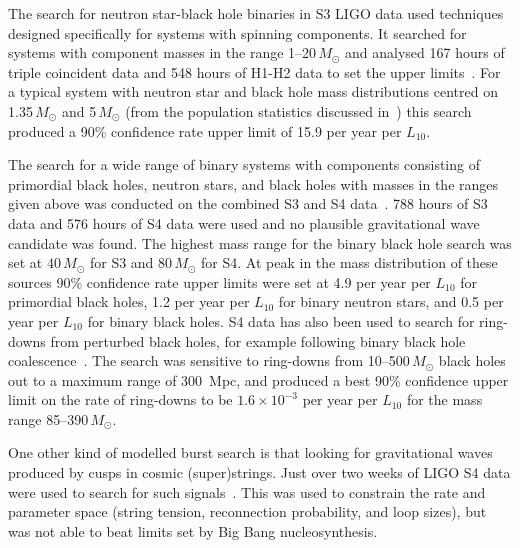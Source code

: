 \documentclass{article}
\begin{document}
The search for neutron star-black hole binaries in S3 LIGO data used techniques
designed specifically for systems with spinning components. It searched for
systems with component masses in the range 1--20\,$M_{\odot}$ and analysed 167
hours of triple coincident data and 548 hours of H1-H2 data to set the upper
limits~\cite{Abbott:2008d}. For a typical system with neutron star and black
hole mass distributions centred on 1.35\,$M_{\odot}$ and 5\,$M_{\odot}$ (from
the population statistics discussed in~\cite{Abbott:2008a}) this search produced
a 90\% confidence rate upper limit of 15.9 per year per $L_{10}$.

The search for a wide range of binary systems with components consisting of
primordial black holes, neutron stars, and black holes with masses in the ranges
given above was conducted on the combined S3 and S4 data~\cite{Abbott:2008a}.
788 hours of S3 data and 576 hours of S4 data were used and no plausible
gravitational wave candidate was found. The highest mass range for the binary
black hole search was set at $40\,M_{\odot}$ for S3 and $80\,M_{\odot}$ for S4. At peak in the
mass distribution of these sources 90\% confidence rate upper limits were set at
4.9 per year per $L_{10}$ for primordial black holes, 1.2 per year per $L_{10}$
for binary neutron stars, and 0.5 per year per $L_{10}$ for binary black holes.
S4 data has also been used to search for ring-downs from perturbed black holes,
for example following binary black hole coalescence~\cite{Abbott:2009g}. The
search was sensitive to ring-downs from 10--500\,$M_{\odot}$ black holes out to
a maximum range of 300~Mpc, and produced a best 90\% confidence upper limit on
the rate of ring-downs to be $1.6\times10^{-3}$ per year per $L_{10}$ for the
mass range 85--390\,$M_{\odot}$.

One other kind of modelled burst search is that looking for gravitational waves
produced by cusps in cosmic (super)strings. Just over two weeks of LIGO S4 data
were used to search for such signals~\cite{Abbott:2009j}. This was used to
constrain the rate and parameter space (string tension, reconnection
probability, and loop sizes), but was not able to beat limits set by Big Bang
nucleosynthesis.
\end{document}
